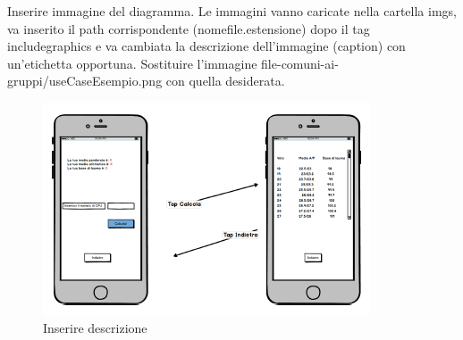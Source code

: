 Inserire immagine del diagramma. Le immagini vanno caricate nella cartella imgs, va inserito il path corrispondente (nomefile.estensione) dopo il tag includegraphics e va cambiata la descrizione dell'immagine (caption) con un'etichetta opportuna. Sostituire l'immagine file-comuni-ai-gruppi/useCaseEsempio.png con quella desiderata.

\begin{figure}
	\centering
	\includegraphics[width=\textwidth]{imgs/file-comuni-ai-gruppi/ActivityDgEsempio}
	\caption{Inserire descrizione}
	\label{fig:prova}
\end{figure}

\clearpage